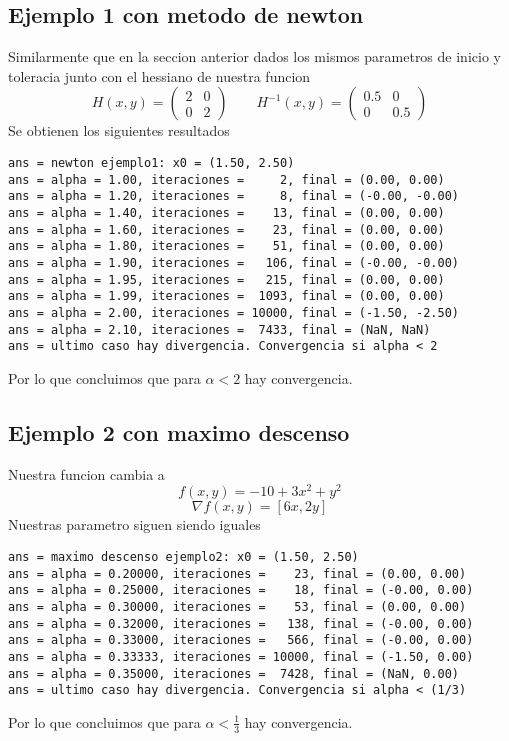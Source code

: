 \documentclass[letterpaper]{article}
\begin{document}
\subsection*{Ejemplo 1 con metodo de newton}
\noindent Similarmente que en la seccion anterior dados los mismos
parametros de inicio y toleracia junto con el hessiano de nuestra funcion
\[ H(x,y) =
  \begin{pmatrix}
    2 & 0 \\
    0 & 2
  \end{pmatrix}
  \qquad
  H^{-1}(x,y) =
  \begin{pmatrix}
    0.5 & 0 \\
    0 & 0.5
  \end{pmatrix}
\]
Se obtienen los siguientes resultados
\begin{verbatim}
ans = newton ejemplo1: x0 = (1.50, 2.50)
ans = alpha = 1.00, iteraciones =     2, final = (0.00, 0.00)
ans = alpha = 1.20, iteraciones =     8, final = (-0.00, -0.00)
ans = alpha = 1.40, iteraciones =    13, final = (0.00, 0.00)
ans = alpha = 1.60, iteraciones =    23, final = (0.00, 0.00)
ans = alpha = 1.80, iteraciones =    51, final = (0.00, 0.00)
ans = alpha = 1.90, iteraciones =   106, final = (-0.00, -0.00)
ans = alpha = 1.95, iteraciones =   215, final = (0.00, 0.00)
ans = alpha = 1.99, iteraciones =  1093, final = (0.00, 0.00)
ans = alpha = 2.00, iteraciones = 10000, final = (-1.50, -2.50)
ans = alpha = 2.10, iteraciones =  7433, final = (NaN, NaN)
ans = ultimo caso hay divergencia. Convergencia si alpha < 2
\end{verbatim}
Por lo que concluimos que para \(\alpha < 2\) hay convergencia.

\subsection*{Ejemplo 2 con maximo descenso}
\noindent Nuestra funcion cambia a
\[ f(x,y) = -10 + 3 x^2 + y^2 \]
\[ \nabla f (x,y) = [6 x , 2 y ] \]
Nuestras parametro siguen siendo iguales
\begin{verbatim}
ans = maximo descenso ejemplo2: x0 = (1.50, 2.50)
ans = alpha = 0.20000, iteraciones =    23, final = (0.00, 0.00)
ans = alpha = 0.25000, iteraciones =    18, final = (-0.00, 0.00)
ans = alpha = 0.30000, iteraciones =    53, final = (0.00, 0.00)
ans = alpha = 0.32000, iteraciones =   138, final = (-0.00, 0.00)
ans = alpha = 0.33000, iteraciones =   566, final = (-0.00, 0.00)
ans = alpha = 0.33333, iteraciones = 10000, final = (-1.50, 0.00)
ans = alpha = 0.35000, iteraciones =  7428, final = (NaN, 0.00)
ans = ultimo caso hay divergencia. Convergencia si alpha < (1/3)
\end{verbatim}
Por lo que concluimos que para \(\alpha < \frac 1 3 \) hay convergencia.
\end{document}

